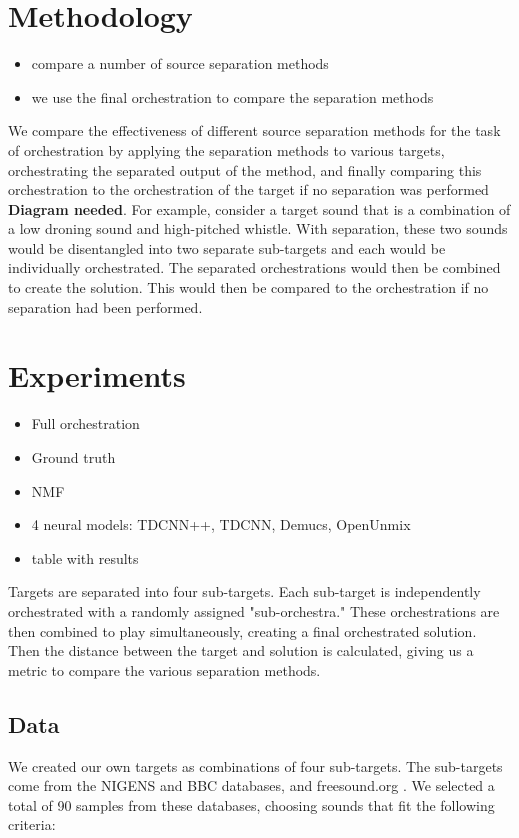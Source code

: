 \documentclass{article}
\begin{document}
	
	\section{Methodology}\label{sec:methodology}
	\begin{itemize}
		\item compare a number of source separation methods
		\item we use the final orchestration to compare the separation methods
	\end{itemize}
	
	We compare the effectiveness of different source separation methods for the task of orchestration by applying the separation methods to various targets, orchestrating the separated output of the method, and finally comparing this orchestration to the orchestration of the target if no separation was performed \textbf{Diagram needed}. For example, consider a target sound that is a combination of a low droning sound and high-pitched whistle. With separation, these two sounds would be disentangled into two separate sub-targets and each would be individually orchestrated. The separated orchestrations would then be combined to create the solution. This would then be compared to the orchestration if no separation had been performed.
	
	
	\section{Experiments}\label{sec:experiments}
	\begin{itemize}
		\item Full orchestration
		\item Ground truth
		\item NMF
		\item 4 neural models: TDCNN++, TDCNN, Demucs, OpenUnmix
		\item table with results
	\end{itemize}
	
	Targets are separated into four sub-targets. Each sub-target is independently orchestrated with a randomly assigned "sub-orchestra." These orchestrations are then combined to play simultaneously, creating a final orchestrated solution. Then the distance between the target and solution is calculated, giving us a metric to compare the various separation methods.
	
		\subsection{Data}
		We created our own targets as combinations of four sub-targets. The sub-targets come from the NIGENS \cite{NIGENS} and BBC \cite{BBC} databases, and freesound.org \cite{freesound}. We selected a total of 90 samples from these databases, choosing sounds that fit the following criteria: 
		
\end{document}
